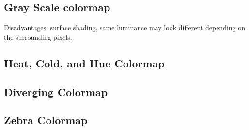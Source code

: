\subsection{Gray Scale colormap} %
\label{ssub:gray_scale_colormap}

Disadvantages: surface shading, same luminance may look different depending on the surrounding pixels.

\subsection{Heat, Cold, and Hue Colormap} %
\label{sub:heat_and_cold_colormap}

\subsection{Diverging Colormap} %
\label{sub:diverging_colormap}


\subsection{Zebra Colormap} %
\label{sub:zebra_colormap}


